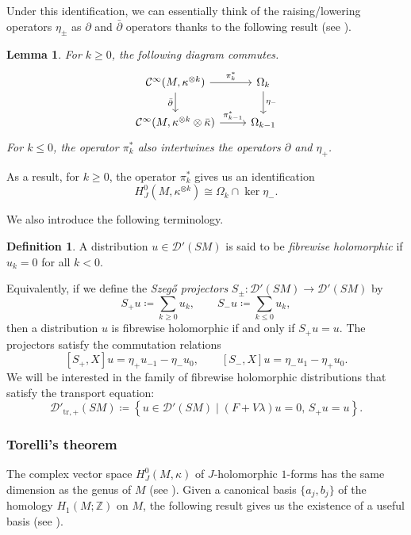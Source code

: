 \documentclass[reqno,12pt,letterpaper]{amsart}
\newtheorem{lemma}[proposition]{Lemma}
\theoremstyle{definition}
\newtheorem{definition}[proposition]{Definition}
\theoremstyle{remark}
\theoremstyle{definition}
\numberwithin{equation}{section}
\newcommand{\Z}{\mathbb{Z}}
\begin{document}
Under this identification, we can essentially think of the raising/lowering operators $\eta_\pm$ as $\partial$ and $\bar{\partial}$ operators thanks to the following result (see \cite[pp.~153--154]{paternain23b}). 
\begin{lemma}\label{lemma:raising-lowering-equivalence}
For $k\geq 0$, the following diagram commutes.
\begin{equation*}
\begin{tikzcd}
\mathcal{C}^\infty(M, \kappa^{\otimes k})\arrow[d, "\bar{\partial}" ']\arrow[r, "\pi_k^\ast"] & \Omega_k\arrow[d, "\eta_-"]\\
\mathcal{C}^\infty(M, \kappa^{\otimes k}\otimes \bar{\kappa})\arrow[r, "\pi_{k-1}^\ast"] & \Omega_{k-1}
\end{tikzcd}
\end{equation*}
For $k\leq 0$, the operator $\pi_k^*$ also intertwines the operators $\partial$ and $\eta_+$. 
\end{lemma}
As a result, for $k\geq 0$, the operator $\pi_k^*$ gives us an identification
$$H^0_J (M, \kappa^{\otimes k})\cong \Omega_k \cap \ker \eta_-.$$

We also introduce the following terminology.
\begin{definition}
A distribution $u\in \mathcal{D}'(SM)$ is said to be \textit{fibrewise holomorphic}  if $u_k=0$ for all $k<0$.
\end{definition}
Equivalently, if we define the \textit{Szegő projectors} $S_\pm : \mathcal{D}'(SM)\to \mathcal{D}'(SM)$ by $$S_+u \coloneqq \sum_{k\geq 0}u_k, \qquad S_-u \coloneqq \sum_{k\leq 0}u_k,$$
then a distribution $u$ is fibrewise holomorphic if and only if $S_+ u = u$. The projectors satisfy the commutation relations
\begin{equation}\label{eq:commutation}
[S_+, X]u=\eta_+ u_{-1}-\eta_- u_0, \qquad [S_-, X]u=\eta_- u_1-\eta_+ u_0.
\end{equation}
We will be interested in the family of fibrewise holomorphic distributions that satisfy the transport equation:
\begin{equation}\label{eq:invariant-fibrewiseholomorphic}
\mathcal{D}'_{\text{tr},+}(SM)  \coloneqq\left\{u\in \mathcal{D}'(SM) \mid (F+V\lambda)u=0, \, S_+ u = u\right\}.
\end{equation}
\subsubsection{Torelli's theorem} The complex vector space $H^0_J(M, \kappa)$ of $J$-holomorphic $1$-forms has the same dimension as the genus of $M$ (see \cite[Proposition III.2.7]{farkas92}). Given a canonical basis $\{a_j, b_j\}$ of the homology $H_1(M;\Z)$ on $M$, the following result gives us the existence of a useful basis (see \cite[Proposition, p. 63]{farkas92}). 
\end{document}
